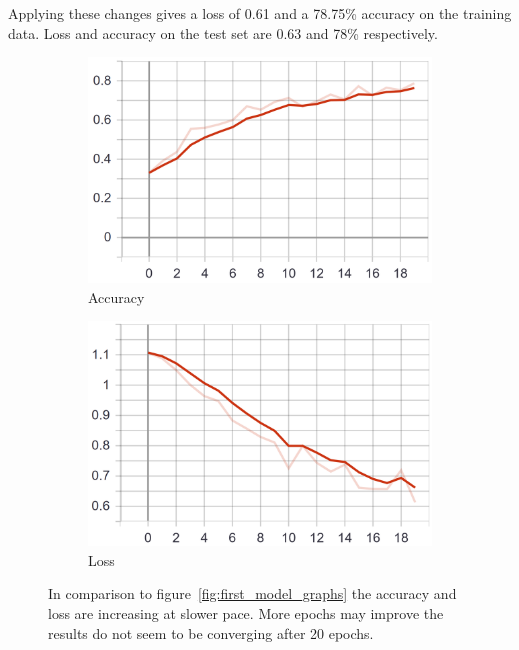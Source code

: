 Applying these changes gives a loss of 0.61 and a 78.75\% accuracy on the training data.
Loss and accuracy on the test set are 0.63 and 78\% respectively.

\begin{figure}
    \centering
    \begin{subfigure}[b]{0.4\textwidth}
        \includegraphics[width=\textwidth]{images/first_model_data_augmentation_acc.png}
        \caption{Accuracy}
        \label{fig:first_model_data_augmentation_acc}
    \end{subfigure}
    \begin{subfigure}[b]{0.4\textwidth}
        \includegraphics[width=\textwidth]{images/first_model_data_augmentation_loss.png}
        \caption{Loss}
        \label{fig:first_model_data_augmentation_loss}
    \end{subfigure}
    \caption{In comparison to figure~\ref{fig:first_model_graphs} the accuracy and loss are increasing at slower pace. More epochs may improve the results do not seem to be converging after 20 epochs.}
    \label{fig:first_model_data_augmentation_graphs}
\end{figure}

